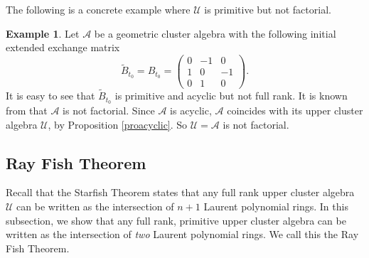 \documentclass{amsart}
\theoremstyle{definition}
\newtheorem{example}[theorem]{Example}
\theoremstyle{remark}
\numberwithin{equation}{section}
\begin{document}
The following is a concrete example where $\mathcal U$ is primitive but not factorial.

\begin{example}
Let $\mathcal A$ be a geometric cluster algebra with the following initial extended exchange matrix $$\widetilde B_{t_0}= B_{t_0}=\begin{pmatrix}0&-1&0\\1&0&-1\\0&1&0\end{pmatrix}.$$
It is easy to see that $\widetilde B_{t_0}$ is primitive and acyclic but not full rank.
It is known from \cite[Proposition 6.1]{GLS13} that $\mathcal A$ is not factorial. Since $\mathcal A$ is acyclic, $\mathcal A$ coincides with its upper cluster algebra $\mathcal U$, by Proposition \ref{proacyclic}. So $\mathcal U=\mathcal A$ is not factorial.
\end{example}


\subsection{Ray Fish Theorem}\label{sec44}
Recall that the Starfish Theorem states that any full rank upper cluster algebra $\mathcal U$ can be written as the intersection of $n+1$ Laurent polynomial rings. In this subsection, we show that any full rank, primitive upper cluster algebra can be written as the intersection of {\em two} Laurent polynomial rings. We call this the Ray Fish Theorem.
\end{document}
